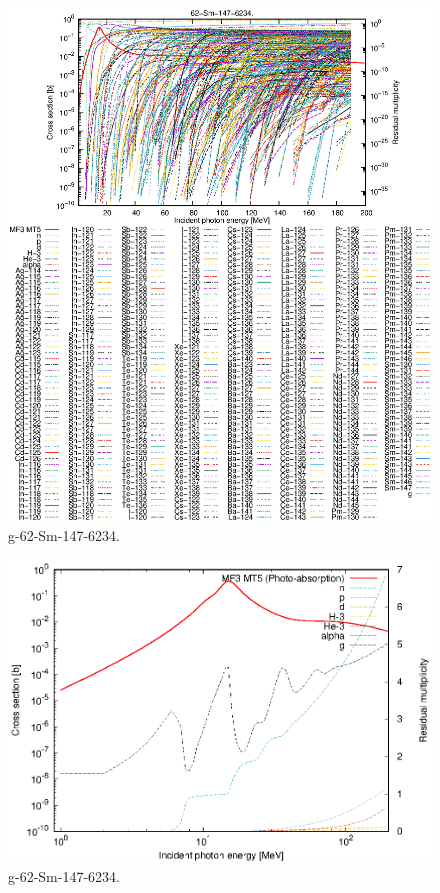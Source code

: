 \begin{figure}
 \includegraphics[width=\linewidth]{eps/g_62-Sm-147_6234.eps}
  \caption{g-62-Sm-147-6234.}
\end{figure}
\newpage \clearpage

\begin{figure}
 \includegraphics[width=\linewidth]{eps-log/g_62-Sm-147_6234.eps}
 \caption{g-62-Sm-147-6234.}
\end{figure}
\newpage \clearpage

